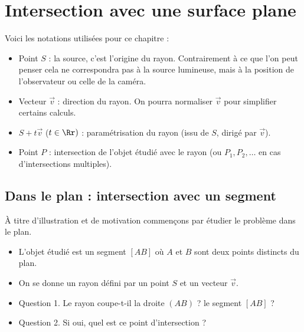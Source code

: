 \documentclass[11pt,class=report,crop=false]{standalone}
\begin{document}

%
%
%






\section{Intersection avec une surface plane}

Voici les notations utilisées pour ce chapitre :
\begin{itemize}
  \item Point $S$ : la source, c'est l'origine du rayon. Contrairement à ce que l'on peut penser cela ne correspondra pas à la source lumineuse, mais à la position de l'observateur ou celle de la caméra.
  \item Vecteur $\vec v$ : direction du rayon. On pourra normaliser $\vec v$ pour simplifier certains calculs.
  \item $S + t \vec v$ ($t\in\Rr)$ : paramétrisation du rayon (issu de $S$, dirigé par $\vec v$).
  \item Point $P$ : intersection de l'objet étudié avec le rayon (ou $P_1, P_2,\ldots$ en cas d'intersections multiples).
\end{itemize}

\subsection{Dans le plan : intersection avec un segment}

À titre d'illustration et de motivation commençons par étudier le problème dans le plan.
\begin{itemize}
  \item L'objet étudié est un segment $[AB]$ où $A$ et $B$ sont deux points distincts du plan.
  \item On se donne un rayon défini par un point $S$ et un vecteur $\vec v$.
  \item Question 1. Le rayon coupe-t-il la droite $(AB)$ ? le segment $[AB]$ ?
  \item Question 2. Si oui, quel est ce point d'intersection ?
\end{itemize}
\end{document}

